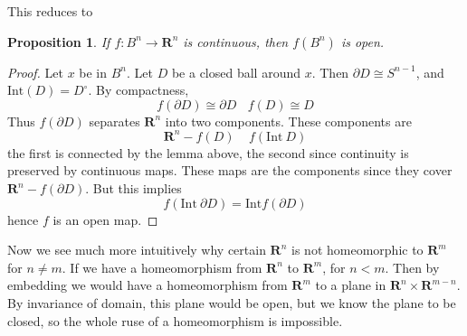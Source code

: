 \documentclass{article}
\theoremstyle{plain}
\newtheorem{prop}[theorem]{Proposition}
\begin{document}
This reduces to

\begin{prop}
    If $f: B^n \to \mathbf{R}^n$ is continuous, then $f(B^n)$ is open.
\end{prop}
\begin{proof}
    Let $x$ be in $B^n$. Let $D$ be a closed ball around $x$. Then $\partial D \cong S^{n-1}$, and $\text{Int}(D) = D^\circ$. By compactness,
    \[ f(\partial D) \cong \partial D\ \ \ \ f(D) \cong D \]
    Thus $f(\partial D)$ separates $\mathbf{R}^n$ into two components. These components are
    \[ \mathbf{R}^n - f(D)\ \ \ \ \ f(\text{Int}\ D) \]
    the first is connected by the lemma above, the second since continuity is preserved by continuous maps. These maps are the components since they cover $\mathbf{R}^n - f(\partial D)$. But this implies
    \[ f(\text{Int}\ \partial D) = \text{Int} f(\partial D) \]
    hence $f$ is an open map.
\end{proof}

Now we see much more intuitively why certain $\mathbf{R}^n$ is not homeomorphic to $\mathbf{R}^m$ for $n \neq m$. If we have a homeomorphism from $\mathbf{R}^n$ to $\mathbf{R}^m$, for $n < m$. Then by embedding we would have a homeomorphism from $\mathbf{R}^m$ to a plane in $\mathbf{R}^n \times \mathbf{R}^{m-n}$. By invariance of domain, this plane would be open, but we know the plane to be closed, so the whole ruse of a homeomorphism is impossible.
\end{document}

